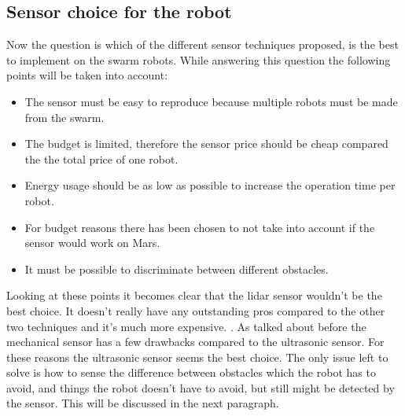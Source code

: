 \documentclass[10pt,a4paper]{article}
\begin{document}
\subsection{Sensor choice for the robot}
Now the question is which of the different sensor techniques proposed, is the best to implement on the swarm robots. While answering this question the following points will be taken into account:

\begin{itemize}
\setlength\itemsep{0em}
    \item The sensor must be easy to reproduce because multiple robots must be made from the swarm.
    \item The budget is limited, therefore the sensor price should be cheap compared the the total price of one robot.
    \item Energy usage should be as low as possible to increase the operation time per robot.
    \item For budget reasons there has been chosen to not take into account if the sensor would work on Mars.
    \item It must be possible to discriminate between different obstacles.
\end{itemize}

Looking at these points it becomes clear that the lidar sensor wouldn't be the best choice. It doesn't really have any outstanding pros compared to the other two techniques and it's much more expensive. . As talked about before the mechanical sensor has a few drawbacks compared to the ultrasonic sensor. For these reasons the ultrasonic sensor seems the best choice. The only issue left to solve is how to sense the difference between obstacles which the robot has to avoid, and things the robot doesn't have to avoid, but still might be detected by the sensor. This will be discussed in the next paragraph.
\end{document}
